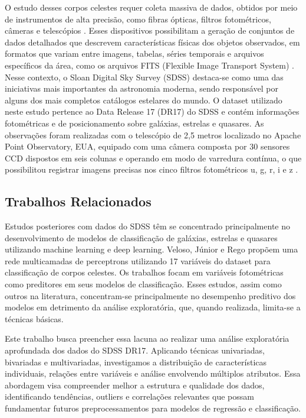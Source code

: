 \documentclass[conference]{IEEEtran}
\begin{document}
O estudo desses corpos celestes requer coleta massiva de dados, obtidos por meio de instrumentos de alta precisão, como fibras ópticas, filtros fotométricos, câmeras e telescópios \cite{b3}. Esses dispositivos possibilitam a geração de conjuntos de dados detalhados que descrevem características físicas dos objetos observados, em formatos que variam entre imagens, tabelas, séries temporais e arquivos específicos da área, como os arquivos FITS (Flexible Image Transport System) \cite{b4}. Nesse contexto, o Sloan Digital Sky Survey (SDSS) destaca-se como uma das iniciativas mais importantes da astronomia moderna, sendo responsável por alguns dos mais completos catálogos estelares do mundo. O dataset utilizado neste estudo pertence ao Data Release 17 (DR17) do SDSS e contém informações fotométricas e de posicionamento sobre galáxias, estrelas e quasares. As observações foram realizadas com o telescópio de 2,5 metros localizado no Apache Point Observatory, EUA, equipado com uma câmera composta por 30 sensores CCD dispostos em seis colunas e operando em modo de varredura contínua, o que possibilitou registrar imagens precisas nos cinco filtros fotométricos u, g, r, i e z \cite{b3}.
\subsection{Trabalhos Relacionados}
Estudos posteriores com dados do SDSS têm se concentrado principalmente no desenvolvimento de modelos de classificação de galáxias, estrelas e quasares utilizando machine learning e deep learning. Veloso, Júnior e Rego \cite{b5} propõem uma rede multicamadas de perceptrons utilizando 17 variáveis do dataset para classificação de corpos celestes. Os trabalhos \cite{b6, b7, b8} focam em variáveis fotométricas como preditores em seus modelos de classificação. Esses estudos, assim como outros na literatura, concentram-se principalmente no desempenho preditivo dos modelos em detrimento da análise exploratória, que, quando realizada, limita-se a técnicas básicas. 


Este trabalho busca preencher essa lacuna ao realizar uma análise exploratória aprofundada dos dados do SDSS DR17. Aplicando técnicas univariadas, bivariadas e multivariadas, investigamos a distribuição de características individuais, relações entre variáveis e análise envolvendo múltiplos atributos. Essa abordagem visa compreender melhor a estrutura e qualidade dos dados, identificando tendências, outliers e correlações relevantes que possam fundamentar futuros preprocessamentos para modelos de regressão e classificação.
\end{document}
